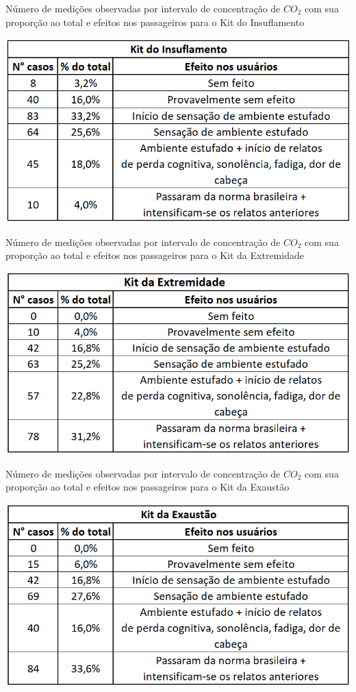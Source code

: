 \documentclass[acronym,symbols,table]{fei}
\begin{document}
\newpage

\begin{table}[!htb]
 \centering
    \caption{Número de medições observadas por intervalo de concentração de ${CO}_{2}$ com sua proporção ao total e efeitos nos passageiros para o Kit do Insuflamento}
    \includegraphics[width=0.65\linewidth]{Tabelas/tabco2meio.png}
    \label{tab:tabco2meio}
\end{table}

\begin{table}[!htb]
 \centering
    \caption{Número de medições observadas por intervalo de concentração de ${CO}_{2}$ com sua proporção ao total e efeitos nos passageiros para o Kit da Extremidade}
    \includegraphics[width=0.65\linewidth]{Tabelas/tabco2canto.png}
    \label{tab:tabco2canto}
\end{table}

\begin{table}[!htb]
 \centering
    \caption{Número de medições observadas por intervalo de concentração de ${CO}_{2}$ com sua proporção ao total e efeitos nos passageiros para o Kit da Exaustão}
    \includegraphics[width=0.65\linewidth]{Tabelas/tabco2exaust.png}
    \label{tab:tabco2exaust}
\end{table}
\end{document}
